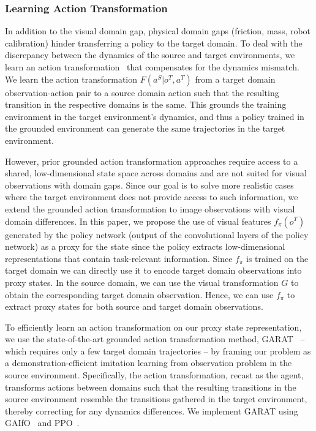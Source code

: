 \subsubsection{\textbf{Learning Action Transformation}}
\label{sec:action_transformation}

In addition to the visual domain gap, physical domain gaps (\eg friction, mass, robot calibration) hinder transferring a policy to the target domain.  To deal with the discrepancy between the dynamics of the source and target environments, we learn an action transformation~\citep{hanna2017grounded, desai2020stochastic, karnan2020reinforced, desai2020imitation} that compensates for the dynamics mismatch.
We learn the action transformation $F(a^{S}|o^T,a^{T})$ from a target domain observation-action pair to a source domain action such that the resulting transition in the respective domains is the same.  This grounds the training environment in the target environment's dynamics, and thus a policy trained in the grounded environment can generate the same trajectories in the target environment.  

However, prior grounded action transformation approaches require access to a shared, low-dimensional state space across domains and are not suited for visual observations with domain gaps. Since our goal is to solve more realistic cases where the target environment does not provide access to such information, we extend the grounded action transformation to image observations with visual domain differences.  In this paper, we propose the use of visual features $f_\pi(o^T)$ generated by the policy network (\ie output of the convolutional layers of the policy network) as a proxy for the state since the policy extracts low-dimensional representations that contain task-relevant information.  Since $f_\pi$ is trained on the target domain we can directly use it to encode target domain observations into proxy states.  In the source domain, we can use the visual transformation $G$ to obtain the corresponding target domain observation. Hence, we can use $f_\pi$ to extract proxy states for both source and target domain observations.

To efficiently learn an action transformation on our proxy state representation, we use the state-of-the-art grounded action transformation method, GARAT~\citep{desai2020imitation} -- which requires only a few target domain trajectories -- by framing our problem as a demonstration-efficient imitation learning from observation problem in the source environment.  Specifically, the action transformation, recast as the agent, transforms actions between domains such that the resulting transitions in the source environment resemble the transitions gathered in the target environment, thereby correcting for any dynamics differences.  
We implement GARAT using GAIfO~\citep{torabi2018generative} and PPO~\citep{PPO}.


